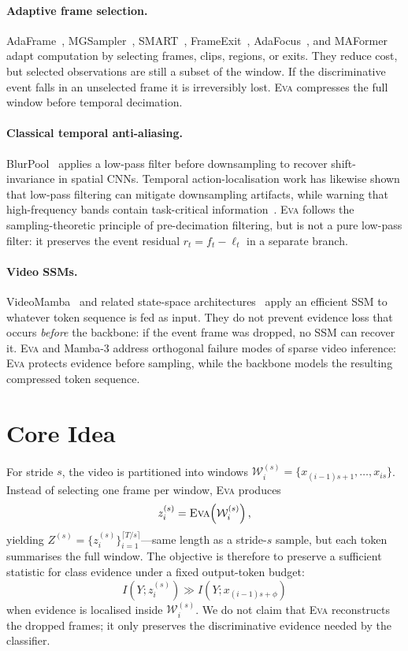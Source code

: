 \documentclass[10pt,twocolumn]{article}
\newcommand{\EVA}{\textsc{Eva}}
\begin{document}
\paragraph{Adaptive frame selection.}
AdaFrame~\cite{adaframe}, MGSampler~\cite{mgsampler}, SMART~\cite{smart},
FrameExit~\cite{frameexit}, AdaFocus~\cite{adafocus}, and MAFormer~\cite{maformer}
adapt computation by selecting frames, clips, regions, or exits. They reduce
cost, but selected observations are still a subset of the window. If the
discriminative event falls in an unselected frame it is irreversibly lost.
\EVA{} compresses the full window before temporal decimation.

\paragraph{Classical temporal anti-aliasing.}
BlurPool~\cite{blurpool} applies a low-pass filter before downsampling to
recover shift-invariance in spatial CNNs.
Temporal action-localisation work has likewise shown that low-pass filtering can
mitigate downsampling artifacts, while warning that high-frequency bands contain
task-critical information~\cite{lpf_tal}. \EVA{} follows the sampling-theoretic
principle of pre-decimation filtering, but is not a pure low-pass filter:
it preserves the event residual $r_t = f_t - \ell_t$ in a separate branch.

\paragraph{Video SSMs.}
VideoMamba~\cite{videomamba} and related state-space architectures~\cite{s4,s4d,mamba,mamba2} apply an efficient SSM
to whatever token sequence is fed as input.
They do not prevent evidence loss that occurs \emph{before} the backbone:
if the event frame was dropped, no SSM can recover it.
\EVA{} and Mamba-3 address orthogonal failure modes of sparse video inference:
\EVA{} protects evidence before sampling, while the backbone models the resulting
compressed token sequence.

\section{Core Idea}
\label{sec:core}

For stride $s$, the video is partitioned into windows
$\mathcal{W}_i^{(s)} = \{x_{(i-1)s+1}, \ldots, x_{is}\}$.
Instead of selecting one frame per window, \EVA{} produces
\[
    z_i^{(s)} = \EVA\!\left(\mathcal{W}_i^{(s)}\right),
\]
yielding $Z^{(s)} = \{z_i^{(s)}\}_{i=1}^{\lceil T/s \rceil}$---same length
as a stride-$s$ sample, but each token summarises the full window.
The objective is therefore to preserve a sufficient statistic for class
evidence under a fixed output-token budget:
\[
    I\!\left(Y; z_i^{(s)}\right) \gg I\!\left(Y; x_{(i-1)s+\phi}\right)
\]
when evidence is localised inside $\mathcal{W}_i^{(s)}$.
We do not claim that \EVA{} reconstructs the dropped frames; it only preserves
the discriminative evidence needed by the classifier.
\end{document}
